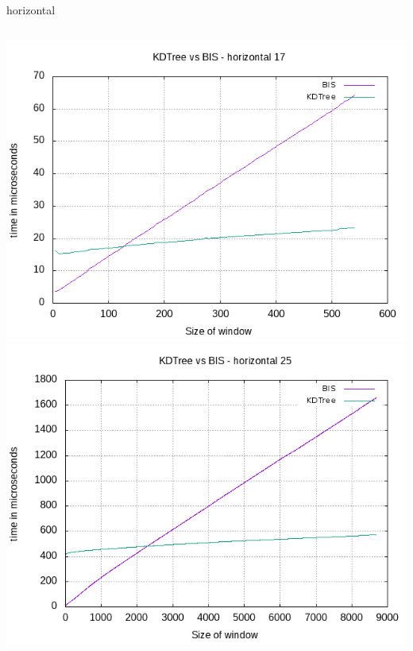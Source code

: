 \documentclass[pdf]{beamer}
\begin{document}
\begin{frame}{horizontal}
  \begin{columns}
    \includegraphics[scale=0.34]{pictures/analysis/hori_17.png}
    \includegraphics[scale=0.34]{pictures/analysis/hori_25.png}
  \end{columns}
\end{frame}
\end{document}
